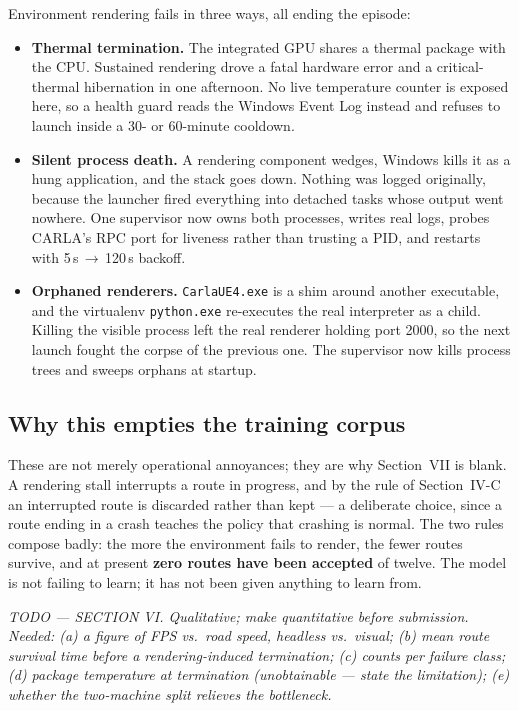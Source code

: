 \documentclass[conference]{IEEEtran}
\newcommand{\TODO}[1]{%
  \begingroup
  \setlength{\FrameSep}{4pt}%
  \def\FrameCommand{{\color{gray!55}\vrule width 1.2pt}\hspace{5pt}}%
  \MakeFramed{\advance\hsize-\width \FrameRestore}%
  \noindent\scriptsize\itshape\color{gray!80}#1%
  \endMakeFramed
  \endgroup}
\begin{document}
Environment rendering fails in three ways, all ending the episode:

\begin{itemize}
\setlength{\itemsep}{1pt}\setlength{\topsep}{2pt}
\setlength{\parskip}{0pt}\setlength{\partopsep}{0pt}
\item \textbf{Thermal termination.} The integrated GPU shares a thermal
package with the CPU. Sustained rendering drove a fatal hardware error
and a critical-thermal hibernation in one afternoon. No live temperature
counter is exposed here, so a health guard reads the Windows Event Log
instead and refuses to launch inside a 30- or 60-minute cooldown.
\item \textbf{Silent process death.} A rendering component wedges,
Windows kills it as a hung application, and the stack goes down. Nothing
was logged originally, because the launcher fired everything into
detached tasks whose output went nowhere. One supervisor now owns both
processes, writes real logs, probes CARLA's RPC port for liveness rather
than trusting a PID, and restarts with 5\,s\,$\rightarrow$\,120\,s
backoff.
\item \textbf{Orphaned renderers.} \texttt{CarlaUE4.exe} is a shim
around another executable, and the virtualenv \texttt{python.exe}
re-executes the real interpreter as a child. Killing the visible process
left the real renderer holding port 2000, so the next launch fought the
corpse of the previous one. The supervisor now kills process trees and
sweeps orphans at startup.
\end{itemize}

\subsection{Why this empties the training corpus}

These are not merely operational annoyances; they are why Section~VII is
blank. A rendering stall interrupts a route in progress, and by the rule
of Section~IV-C an interrupted route is discarded rather than kept --- a
deliberate choice, since a route ending in a crash teaches the policy
that crashing is normal. The two rules compose badly: the more the
environment fails to render, the fewer routes survive, and at present
\textbf{zero routes have been accepted} of twelve. The model is not
failing to learn; it has not been given anything to learn from.

\TODO{TODO --- SECTION VI. Qualitative; make quantitative before
submission. Needed: (a) a figure of FPS vs.\ road speed, headless vs.\
visual; (b) mean route survival time before a rendering-induced
termination; (c) counts per failure class; (d) package temperature at
termination (unobtainable --- state the limitation); (e) whether the
two-machine split relieves the bottleneck.}
\end{document}
